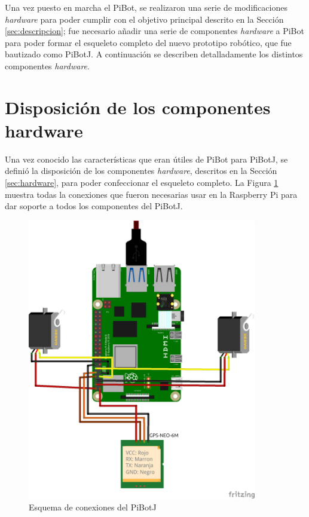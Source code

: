 Una vez puesto en marcha el PiBot, se realizaron una serie de modificaciones \textit{hardware} para poder cumplir con el objetivo principal descrito en la Sección \ref{sec:descripcion}; fue necesario añadir una serie de componentes \textit{hardware} a PiBot para poder formar el esqueleto completo del nuevo prototipo robótico, que fue bautizado como PiBotJ. A continuación se describen detalladamente los distintos componentes \textit{hardware}.

\section{Disposición de los componentes hardware}
\label{sec:disposicionhardware}

Una vez conocido las características que eran útiles de PiBot para PiBotJ, se definió la disposición de los componentes \textit{hardware}, descritos en la Sección \ref{sec:hardware}, para poder confeccionar el esqueleto completo. La Figura \ref{fig:fritzzing} muestra todas la conexiones que fueron necesarias usar en la Raspberry Pi para dar soporte a todos los componentes del PiBotJ. 

\begin{figure} [h!]
	\begin{center}
		\includegraphics[width=10cm]{figs/cap5/modelocompleto_bb3.png}
	\end{center}
	\caption{Esquema de conexiones del PiBotJ} 
	\label{fig:fritzzing}
\end{figure}


